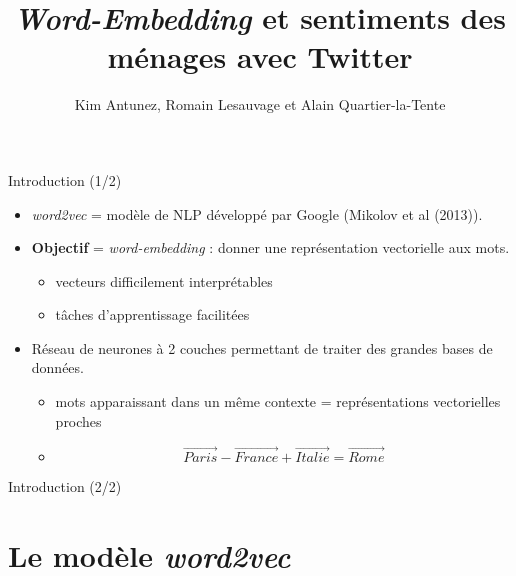 \documentclass[10pt,xcolor=table,color={dvipsnames,usenames},ignorenonframetext,usepdftitle=false,french]{beamer}
\title{\emph{Word-Embedding} et sentiments des ménages avec Twitter}
\author{Kim Antunez, Romain Lesauvage et Alain Quartier-la-Tente}
\date{}
\providecommand{\tightlist}{%
  \setlength{\parskip}{0pt}
  }
\begin{document}
\begin{frame}
\titlepage
\end{frame}

\begin{frame}{Introduction (1/2)}
\protect\hypertarget{introduction-12}{}

\begin{itemize}
\item
  \emph{word2vec} = modèle de NLP développé par Google (Mikolov et al
  (2013)).
\item
  \textbf{Objectif} = \emph{word-embedding} : donner une représentation
  vectorielle aux mots.

  \begin{itemize}
  \tightlist
  \item
    \faMinusSquare{} vecteurs difficilement interprétables
  \item
    \faPlusSquare{} tâches d'apprentissage facilitées
  \end{itemize}
\end{itemize}

\pause

\bigskip

\begin{itemize}
\tightlist
\item
  \faArrowCircleRight{} Réseau de neurones à 2 couches permettant de
  traiter des grandes bases de données.

  \begin{itemize}
  \tightlist
  \item
    mots apparaissant dans un même contexte = représentations
    vectorielles proches
  \item
    \[
    \overrightarrow{Paris} - \overrightarrow{France} + \overrightarrow{Italie} = \overrightarrow{Rome}
    \]
  \end{itemize}
\end{itemize}

\end{frame}

\begin{frame}{Introduction (2/2)}
\protect\hypertarget{introduction-22}{}

\resizebox{\textwidth}{!}{}

\end{frame}

\hypertarget{le-moduxe8le-word2vec}{%
\section{\texorpdfstring{Le modèle
\emph{word2vec}}{Le modèle word2vec}}\label{le-moduxe8le-word2vec}}
\end{document}
